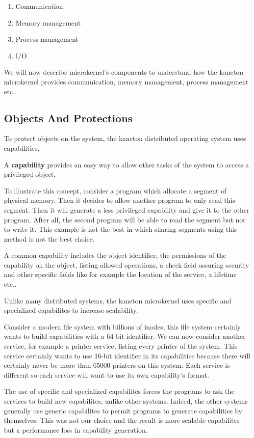 \documentclass[10pt,a4wide]{article}
\begin{document}
\begin{multicols}{2}
\begin{enumerate}
\item Communication
\item Memory management
\item Process management
\item I/O

\end{enumerate}

We will now describe microkernel's components to understand how the kaneton
microkernel provides communication, memory management, process management etc..

\subsection{Objects And Protections}

To protect objects on the system, the kaneton distributed operating system uses
capabilities.

A \textbf{capability} provides an easy way to allow other tasks of the
system to access a privileged object.

To illustrate this concept, consider a program which allocate a segment of
physical memory. Then it decides to allow another program to only read
this segment. Then it will generate a less privileged capability and give
it to the other program. After all, the second program will be able to read
the segment but not to write it. This example is not the best in which sharing
segments using this method is not the best choice.

A common capability includes the object identifier, the permissions of the
capability on the object, listing allowed operations, a check field assuring
security and other specific fields like for example the location of the
service, a lifetime etc..

Unlike many distributed systems, the kaneton microkernel uses specific and
specialized capabilites to increase scalability.

Consider a modern file system with billions of inodes; this file system
certainly wants to build capabilities with a 64-bit identifier.
We can now consider another service, for example a printer service, listing
every printer of the system. This service certainly wants to use 16-bit
identifier in its capabilities because there will certainly never be more than
65000 printers on this system. Each service is different so each service
will want to use its own capability's format.

The use of specific and specialized capabilites forces the programs to ask
the services to build new capabilites, unlike other systems. Indeed,
the other systems generally use generic capabilites to permit programs to
generate capabilities by themselves. This was not our choice and the result is
more scalable capabilites but a performance loss in capability generation.


\end{multicols}
\end{document}

